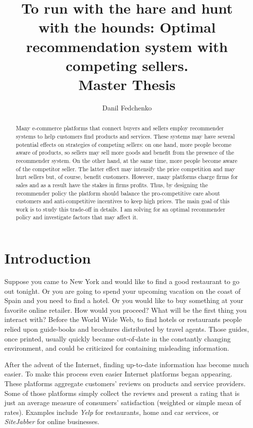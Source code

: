 \documentclass[a4paper]{article}
\title{To run with the hare and hunt with the hounds: Optimal recommendation system with competing sellers. \\ Master Thesis}
\date{}
\author{Danil Fedchenko}%
\begin{document}
 
	\maketitle
	\begin{abstract}
		Many e-commerce platforms that connect buyers and sellers employ recommender systems to help customers find products and services. These systems may have several potential effects on strategies of competing sellers: on one hand, more people become aware of products, so sellers may sell more goods and benefit from the presence of the recommender system. On the other hand, at the same time, more people become aware of the competitor seller. The latter effect may intensify the price competition and may hurt sellers but, of course, benefit customers. However, many platforms charge firms for sales and as a result have the stakes in firms profits. Thus, by designing the recommender policy the platform should balance the pro-competitive care about customers and anti-competitive incentives to keep high prices. The main goal of this work is to study this trade-off in details. I am solving for an optimal recommender policy and investigate factors that may affect it.
	\end{abstract}
\newpage
\tableofcontents
\newpage
	\section{Introduction}
	
	
		Suppose you came to New York and would like to find a good restaurant to go out tonight. Or you are going to spend your upcoming vacation on the coast of Spain and you need to find a hotel. Or you would like to buy something at your favorite online retailer. How would you proceed? What will be the first thing you interact with?  Before the World Wide Web, to find hotels or restaurants people relied upon guide-books and brochures distributed by travel agents. Those guides, once printed, usually quickly became out-of-date in the constantly changing environment, and could be criticized for containing misleading information. 
	
	
	
	
	
	After the advent of the Internet, finding up-to-date information has become much easier. To make this process even easier Internet platforms began appearing. These platforms aggregate customers' reviews on products and service providers. Some of those platforms simply collect the reviews and present a rating that is just an average measure of consumers' satisfaction (weighted or simple mean of rates). Examples include \textit{Yelp} for restaurants, home and car services, or \textit{SiteJabber} for online businesses.
	
\end{document}
